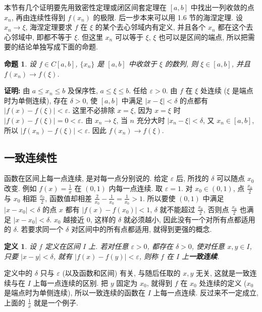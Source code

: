 \documentclass[UTF8,openany]{ctexbook}
\theoremstyle{chinesetextbook}
\newenvironment{cnproof}{\par\indent\textbf{证明:} \ignorespaces}{\par}
\newtheorem*{definitionsingle}{定义}
\newtheorem*{propositionsingle}{命题}
\begin{document}
本节有几个证明要先用致密性定理或闭区间套定理在 $[a,b]$ 中找出一列收敛的点 $x_n$, 再由连续性得到 $f(x_n)$ 的极限. 后一步本来可以用 1.6 节的海涅定理. 设 $x_n\to\xi$, 海涅定理要求 $f$ 在 $\xi$ 的某个去心邻域内有定义, 并且各个 $x_n$ 都在这个去心邻域中, 即都不等于 $\xi$. 但这里 $x_n$ 可以等于 $\xi$, $\xi$ 也可以是区间的端点, 所以把需要的结论单独写成下面的命题.
\begin{propositionsingle}
设 $f\in C[a,b]$, $\{x_n\}$ 是 $[a,b]$ 中收敛于 $\xi$ 的数列, 则 $\xi\in[a,b]$, 并且 $f(x_n)\to f(\xi)$.
\end{propositionsingle}
\begin{cnproof}
由 $a\le x_n\le b$ 及保序性, $a\le\xi\le b$. 任给 $\varepsilon>0$. 由 $f$ 在 $\xi$ 处连续 ($\xi$ 是端点时为单侧连续), 存在 $\delta>0$, 使 $[a,b]$ 中满足 $|x-\xi|<\delta$ 的点都有 $|f(x)-f(\xi)|<\varepsilon$. 这里不必排除 $x=\xi$, 因为 $x=\xi$ 时 $|f(x)-f(\xi)|=0<\varepsilon$. 由 $x_n\to\xi$, 当 $n$ 充分大时 $|x_n-\xi|<\delta$, 又 $x_n\in[a,b]$, 所以 $|f(x_n)-f(\xi)|<\varepsilon$. 因此 $f(x_n)\to f(\xi)$.
\end{cnproof}
\subsection{一致连续性}
函数在区间上每一点连续, 是对每一点分别说的. 给定 $\varepsilon$ 后, 所找的 $\delta$ 可以随点 $x_0$ 改变. 例如 $\displaystyle f(x)=\frac1x$ 在 $(0,1)$ 内每一点连续. 取 $\varepsilon=1$. 对 $x_0\in(0,1)$, 点 $\displaystyle\frac{x_0}2$ 与 $x_0$ 相距 $\displaystyle\frac{x_0}2$, 函数值却相差 $\displaystyle\frac2{x_0}-\frac1{x_0}=\frac1{x_0}>1$. 所以要使 $(0,1)$ 中满足 $|x-x_0|<\delta$ 的点 $x$ 都有 $|f(x)-f(x_0)|<1$, $\delta$ 就不能超过 $\displaystyle\frac{x_0}2$, 否则点 $\displaystyle\frac{x_0}2$ 也满足 $|x-x_0|<\delta$. $x_0$ 越接近 $0$, 这样的 $\delta$ 就必须越小, 因此没有一个对所有点都适用的 $\delta$. 若要求同一个 $\delta$ 对区间中的所有点都适用, 就得到更强的概念.
\begin{definitionsingle}
设 $f$ 定义在区间 $I$ 上. 若对任意 $\varepsilon>0$, 都存在 $\delta>0$, 使对任意 $x,y\in I$, 只要 $|x-y|<\delta$, 就有 $|f(x)-f(y)|<\varepsilon$, 则称 $f$ 在 $I$ 上\textbf{一致连续}.
\end{definitionsingle}
定义中的 $\delta$ 只与 $\varepsilon$ (以及函数和区间) 有关, 与随后任取的 $x,y$ 无关, 这就是一致连续与在 $I$ 上每一点连续的区别. 把 $y$ 固定为 $x_0$, 就得到 $f$ 在 $x_0$ 处连续的定义 ($x_0$ 是端点时为单侧连续), 所以一致连续的函数在 $I$ 上每一点连续. 反过来不一定成立, 上面的 $\displaystyle\frac1x$ 就是一个例子.
\end{document}
